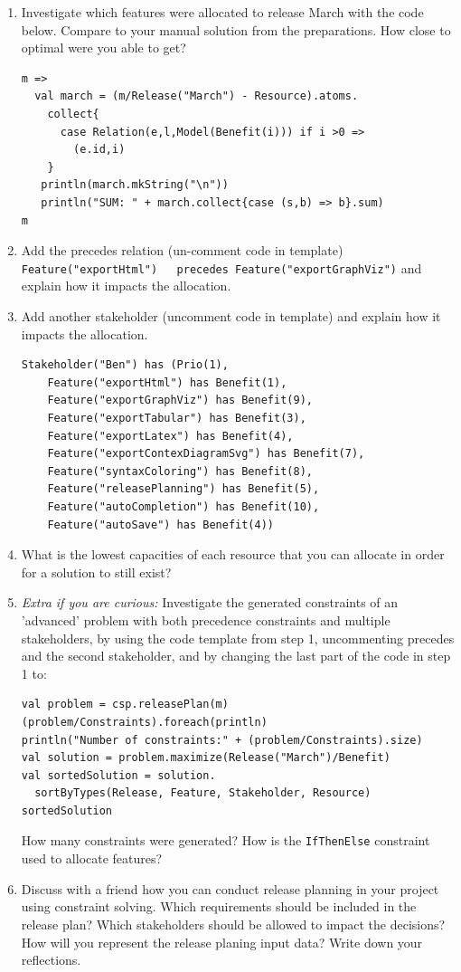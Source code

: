\documentclass[11pt]{article}
\begin{document}
\begin{framed}
\begin{enumerate}
\item Investigate which features were allocated to release March with the code below. Compare to your manual solution from the preparations. How close to optimal were you able to get?

\begin{lstlisting}
m =>
  val march = (m/Release("March") - Resource).atoms.
    collect{
      case Relation(e,l,Model(Benefit(i))) if i >0 => 
        (e.id,i)
    }
   println(march.mkString("\n"))
   println("SUM: " + march.collect{case (s,b) => b}.sum)
m  
\end{lstlisting}
\item Add the precedes relation (un-comment code in template) 
\newline\lstinline+ Feature("exportHtml")   precedes Feature("exportGraphViz")+ \newline and explain how  it impacts the allocation.  
\item Add another stakeholder (uncomment code in template) and explain how it impacts the allocation.
\begin{lstlisting}
Stakeholder("Ben") has (Prio(1), 
    Feature("exportHtml") has Benefit(1),
    Feature("exportGraphViz") has Benefit(9),
    Feature("exportTabular") has Benefit(3),
    Feature("exportLatex") has Benefit(4),
    Feature("exportContexDiagramSvg") has Benefit(7),
    Feature("syntaxColoring") has Benefit(8),    
    Feature("releasePlanning") has Benefit(5),    
    Feature("autoCompletion") has Benefit(10),    
    Feature("autoSave") has Benefit(4)) 
\end{lstlisting}   
\item What is the lowest capacities of each resource that you can allocate in order for a solution to still exist?
\vspace{1.5em}
\item {\it Extra if you are curious:} Investigate the generated constraints of an 'advanced' problem with both precedence constraints and multiple stakeholders, by using the code template from step 1, uncommenting precedes and the second stakeholder, and by changing the last part of the code in step 1 to:
\begin{lstlisting}
val problem = csp.releasePlan(m)
(problem/Constraints).foreach(println)
println("Number of constraints:" + (problem/Constraints).size)
val solution = problem.maximize(Release("March")/Benefit)
val sortedSolution = solution.
  sortByTypes(Release, Feature, Stakeholder, Resource)
sortedSolution
\end{lstlisting}   
How many constraints were generated?
How is the \verb+IfThenElse+ constraint used to allocate features?
\item Discuss with a friend how you can conduct release planning in your project using constraint solving. Which requirements should be included in the release plan? Which stakeholders should be allowed to impact the decisions? How will you represent the release planing input data? Write down your reflections.
\vspace{22em}
\end{enumerate}

\end{framed}
\end{document}
